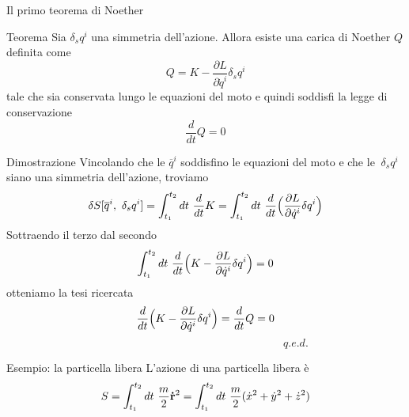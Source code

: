 \begin{frame}{Il primo teorema di Noether}
    \begin{block}{Teorema}
        Sia $\delta_s q^i$ una simmetria dell'azione. Allora esiste una carica di Noether $Q$ definita come
        \begin{equation*}
            Q = K - \frac{\partial L}{\partial \dot q^i} \delta_s q^i
        \end{equation*}
            tale che sia conservata lungo le equazioni del moto e quindi soddisfi la legge di conservazione
        \begin{equation*} 
            \frac{d}{dt} Q = 0
        \end{equation*}
    \end{block}
\end{frame}

\begin{frame}

    \begin{block}{Dimostrazione}
        Vincolando che le $\overline q^i$ soddisfino le equazioni del moto e che le $~\delta_s q^i$ siano una simmetria dell'azione, troviamo
        \begin{equation*}
            \delta S[\overline q^i, ~\delta_s q^i] = \int_{t_1}^{t_2}dt~ \frac{d}{dt} K = \int_{t_1}^{t_2}dt~ \frac{d}{dt} \Big( \frac{\partial L}{\partial\dot q^i} \delta q^i \Big )
        \end{equation*}
          Sottraendo il terzo dal secondo
        \begin{equation*}
            \int_{t_1}^{t_2}dt~ \frac{d}{dt} \Big (K - \frac{\partial L}{\partial\dot q^i} \delta q^i \Big ) = 0
        \end{equation*}
          otteniamo la tesi ricercata
        \begin{equation*}
            \frac{d}{dt} \Big (K - \frac{\partial L}{\partial\dot q^i} \delta q^i \Big ) = \frac{d}{dt} Q = 0
        \end{equation*}
        $\qquad \qquad \qquad \qquad \qquad \qquad \qquad \qquad \qquad \qquad \qquad \qquad \quad q.e.d.$
    \end{block}

\end{frame}

\begin{frame}{Esempio: la particella libera}
    L'azione di una particella libera è
    \begin{equation*}
        S = \int_{t_1}^{t_2}dt~ \frac{m}{2} \mathbf{\dot r}^2 = \int_{t_1}^{t_2}dt~ \frac{m}{2} (\dot x^2 + \dot y^2 + \dot z^2)
    \end{equation*} 
\end{frame}

